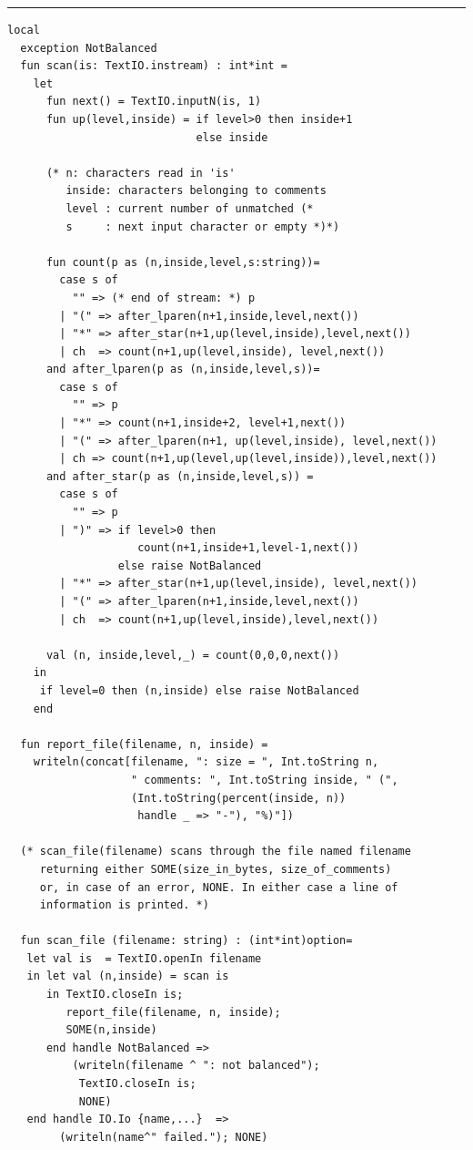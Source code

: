 \documentclass[12pt]{book}
\begin{document}
\pagebreak
\hrule
\begin{verbatim}
local
  exception NotBalanced
  fun scan(is: TextIO.instream) : int*int =
    let
      fun next() = TextIO.inputN(is, 1)
      fun up(level,inside) = if level>0 then inside+1 
                             else inside

      (* n: characters read in 'is'
         inside: characters belonging to comments
         level : current number of unmatched (* 
         s     : next input character or empty *)*)

      fun count(p as (n,inside,level,s:string))=
        case s of
          "" => (* end of stream: *) p
        | "(" => after_lparen(n+1,inside,level,next())
        | "*" => after_star(n+1,up(level,inside),level,next())
        | ch  => count(n+1,up(level,inside), level,next())
      and after_lparen(p as (n,inside,level,s))=
        case s of
          "" => p
        | "*" => count(n+1,inside+2, level+1,next())
        | "(" => after_lparen(n+1, up(level,inside), level,next())
        | ch => count(n+1,up(level,up(level,inside)),level,next())
      and after_star(p as (n,inside,level,s)) =
        case s of
          "" => p
        | ")" => if level>0 then
                    count(n+1,inside+1,level-1,next())
                 else raise NotBalanced
        | "*" => after_star(n+1,up(level,inside), level,next())
        | "(" => after_lparen(n+1,inside,level,next())
        | ch  => count(n+1,up(level,inside),level,next())
    
      val (n, inside,level,_) = count(0,0,0,next())
    in
     if level=0 then (n,inside) else raise NotBalanced
    end
  
  fun report_file(filename, n, inside) = 
    writeln(concat[filename, ": size = ", Int.toString n,
                   " comments: ", Int.toString inside, " (",
                   (Int.toString(percent(inside, n)) 
                    handle _ => "-"), "%)"])

  (* scan_file(filename) scans through the file named filename 
     returning either SOME(size_in_bytes, size_of_comments)
     or, in case of an error, NONE. In either case a line of
     information is printed. *)

  fun scan_file (filename: string) : (int*int)option=
   let val is  = TextIO.openIn filename 
   in let val (n,inside) = scan is
      in TextIO.closeIn is; 
         report_file(filename, n, inside);
         SOME(n,inside)
      end handle NotBalanced => 
          (writeln(filename ^ ": not balanced");
           TextIO.closeIn is;
           NONE)
   end handle IO.Io {name,...}  => 
        (writeln(name^" failed."); NONE)
  

\end{verbatim}
\end{document}
